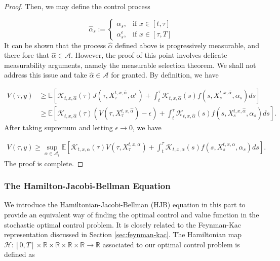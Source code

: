 \documentclass{article}
\begin{document}
\begin{proof}
Then, we may define the control process 

\begin{equation*}
\hat{\alpha}_s:=
\begin{cases}
\alpha_s, & \text{if } x\in[t,\tau]\\
\alpha^\epsilon_s, & \text{if } x\in[\tau,T]
\end{cases}
\end{equation*}
It can be shown that the process $\hat{\alpha}$ defined above is progressively measurable, and there fore that $\hat{\alpha}\in\mathcal{A}$. However, the proof of this point involves delicate measurability arguments, namely the measurable selection theorem. We shall not address this issue and take $\hat{\alpha}\in\mathcal{A}$ for granted. By definition, we have

\begin{equation*}
\begin{aligned}
V(\tau,y)&\geq\mathbb{E}\left[\mathcal{K}_{t,x,\hat{\alpha}}(\tau)J(\tau,X_\tau^{t,x,\hat{\alpha}},\alpha^\epsilon)+\int^\tau_t\mathcal{K}_{t,x,\hat{\alpha}}(s)f(s,X_s^{t,x,\hat{\alpha}},\alpha_s)ds\right]\\
&\geq\mathbb{E}\left[\mathcal{K}_{t,x,\hat{\alpha}}(\tau)(V(\tau,X_\tau^{t,x,\hat{\alpha}})-\epsilon)+\int^\tau_t\mathcal{K}_{t,x,\hat{\alpha}}(s)f(s,X_s^{t,x,\hat{\alpha}},\alpha_s)ds\right].
\end{aligned}
\end{equation*}
After taking supremum and letting $\epsilon\rightarrow0$, we have

\begin{equation*}
\begin{aligned}
V(\tau,y)\geq\sup_{\alpha\in\mathcal{A}_t}\mathbb{E}\left[\mathcal{K}_{t,x,\alpha}(\tau)V(\tau,X_\tau^{t,x,\alpha})+\int^\tau_t\mathcal{K}_{t,x,\alpha}(s)f(s,X_s^{t,x,\alpha},\alpha_s)ds\right].
\end{aligned}
\end{equation*}
The proof is complete.
\end{proof}

\subsubsection{The Hamilton-Jacobi-Bellman Equation}

We introduce the Hamiltonian-Jacobi-Bellman (HJB) equation in this part to provide an equivalent way of finding the optimal control and value function in the stochastic optimal control problem. It is closely related to the Feynman-Kac representation discussed in Section \ref{sec:feynman-kac}. The Hamiltonian map $\mathcal{H}: [0,T]\times\mathbb{R}\times\mathbb{R}\times\mathbb{R}\times\mathbb{R}\rightarrow\mathbb{R}$ associated to our optimal control problem is defined as 
    
\end{document}
